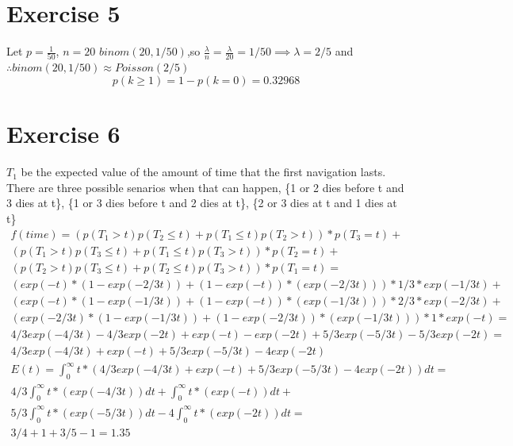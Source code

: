 \documentclass{article}\usepackage[]{graphicx}\usepackage[]{color}
\begin{document}
\section*{Exercise 5}
Let $p=\frac{1}{50}$, $n=20$
$binom(20, 1/50)$,so $\frac{\lambda}{n}=\frac{\lambda}{20}=1/50 \implies \lambda = 2/5$ and $\therefore binom(20, 1/50) \approx Poisson(2/5)$
\begin{equation}
p(k\geq 1) = 1 - p(k=0) = 0.32968
\end{equation}
\section*{Exercise 6}
$T_1$ be the expected value of the amount of time that the first navigation lasts. There are three possible senarios when that can happen, \{1 or 2 dies before t and 3 dies at t\}, \{1 or 3 dies before t and 2 dies at t\}, \{2 or 3 dies at t and 1 dies at t\}
\begin{equation}
\begin{split}
f(time) = (p(T_1 >t)p(T_2 \leq t)+p(T_1 \leq t)p(T_2>t))*p(T_3=t) + \\
(p(T_1 >t)p(T_3 \leq t)+p(T_1 \leq t)p(T_3>t))*p(T_2=t) + \\
(p(T_2 >t)p(T_3 \leq t)+p(T_2 \leq t)p(T_3>t))*p(T_1=t) = \\
(exp(-t)*(1-exp(-2/3t))+(1-exp(-t))*(exp(-2/3t)))*1/3*exp(-1/3t)+\\
(exp(-t)*(1-exp(-1/3t))+(1-exp(-t))*(exp(-1/3t)))*2/3*exp(-2/3t)+\\
(exp(-2/3t)*(1-exp(-1/3t))+(1-exp(-2/3t))*(exp(-1/3t)))*1*exp(-t)=\\
4/3exp(-4/3t)-4/3exp(-2t)+exp(-t)-exp(-2t)+5/3exp(-5/3t)-5/3exp(-2t)=\\
4/3exp(-4/3t)+exp(-t)+5/3exp(-5/3t)-4exp(-2t)
\end{split}
\end{equation}
\begin{equation}
\begin{split}
E(t) = \int_{0}^{\infty} t*(4/3exp(-4/3t)+exp(-t)+5/3exp(-5/3t)-4exp(-2t)) dt = \\
4/3\int_{0}^{\infty} t*(exp(-4/3t)) dt + \int_{0}^{\infty} t*(exp(-t)) dt + \\ 5/3\int_{0}^{\infty} t*(exp(-5/3t)) dt - 4\int_{0}^{\infty} t*(exp(-2t)) dt = \\
3/4+1+3/5-1 = 1.35
\end{split}
\end{equation}
\end{document}
